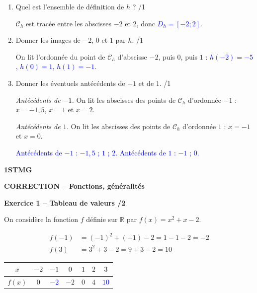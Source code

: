 \documentclass[10pt,a4paper]{article}
\renewcommand{\niveau}{1STMG}
\renewcommand{\chapitre}{Fonctions, généralités}
\renewcommand{\interroversion}[1]{
    \noindent\textbf{\niveau}

    \vspace{-0.5cm}
    \begin{center}
        \textbf{\large CORRECTION -- \chapitre}
    \end{center}

    \vspace{0.1cm}
}
\begin{document}
\begin{enumerate}
    \item Quel est l'ensemble de définition de \(h\) ? \hfill /1

    \(\mathcal{C}_h\) est tracée entre les abscisses \(-2\) et \(2\), donc \textcolor{blue}{\(D_h=[-2;2]\)}.
    \item Donner les images de \(-2\), \(0\) et \(1\) par \(h\). \hfill /1

    On lit l'ordonnée du point de \(\mathcal{C}_h\) d'abscisse \(-2\), puis \(0\), puis \(1\) :
    \textcolor{blue}{\(h(-2)=-5\), \(h(0)=1\), \(h(1)=-1\)}.
    \item Donner les éventuels antécédents de \(-1\) et de \(1\). \hfill /1

    \emph{Antécédents de \(-1\).} On lit les abscisses des points de \(\mathcal{C}_h\) d'ordonnée \(-1\) : \(x=-1{,}5\), \(x=1\) et \(x=2\).

    \emph{Antécédents de \(1\).} On lit les abscisses des points de \(\mathcal{C}_h\) d'ordonnée \(1\) : \(x=-1\) et \(x=0\).

    \textcolor{blue}{Antécédents de \(-1\) : \(-1{,}5\) ; \(1\) ; \(2\). Antécédents de \(1\) : \(-1\) ; \(0\).}
\end{enumerate}

\newpage


\interroversion{B}

\textbf{Exercice 1 -- Tableau de valeurs \hfill /2}

On considère la fonction \(f\) définie sur \(\mathbb{R}\) par \(f(x)=x^2+x-2\).

\[
\begin{aligned}
f(-1) &= (-1)^2+(-1)-2 = 1-1-2 = -2\\
f(3)  &= 3^2+3-2 = 9+3-2 = 10
\end{aligned}
\]

\begin{center}
    \renewcommand{\arraystretch}{1.5}
    \setlength{\tabcolsep}{0.25cm}
    \begin{tabular}{|*{7}{c|}}
    \hline
    \(x\) & \(-2\) & \(-1\) & \(0\) & \(1\) & \(2\) & \(3\) \\
    \hline
    \(f(x)\) & \(0\) & \textcolor{blue}{\(-2\)} & \(-2\) & \(0\) & \(4\) & \textcolor{blue}{\(10\)} \\
    \hline
    \end{tabular}
\end{center}
\end{document}
